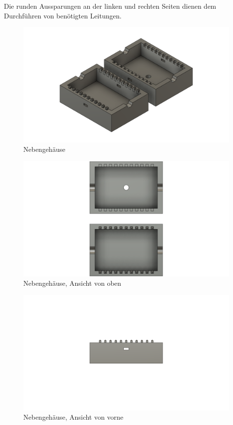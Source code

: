 Die runden Aussparungen an der linken und rechten Seiten dienen dem Durchführen von benötigten Leitungen.
\begin{figure}[H]
  \centering
  \includegraphics[width=\textwidth]{./img/ST_Halterv5}
  \caption{Nebengehäuse}\label{fig:secondary}
\end{figure}
\begin{figure}[H]
  \centering
  \includegraphics[width=\textwidth]{./img/ST_Halterv5_top}
  \caption{Nebengehäuse, Ansicht von oben}\label{fig:secondary_top}
\end{figure}
\begin{figure}[H]
  \centering
  \includegraphics[width=\textwidth]{./img/ST_Halterv5_front}
  \caption{Nebengehäuse, Ansicht von vorne}\label{fig:secondary_front}
\end{figure}
